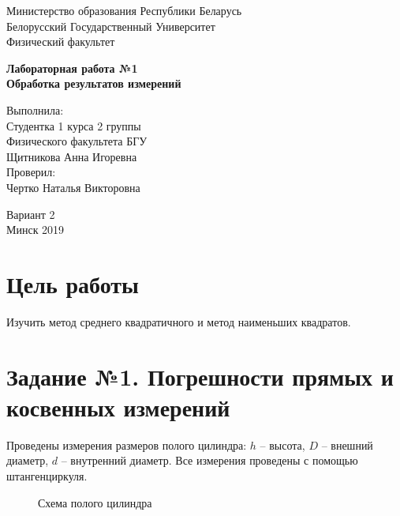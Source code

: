 \begin{titlepage}
	\begin{center}
		Министерство образования Республики Беларусь \\
		Белорусский Государственный Университет \\
		Физический факультет
	\end{center}
	
	\vspace{3cm}
	
	\begin{center}
		\textbf{Лабораторная работа №1} \\
		\textbf{Обработка результатов измерений}
	\end{center}
	
	\vspace{4cm}
	
	\begin{flushright}
		Выполнила: \\
		Студентка 1 курса 2 группы \\
		Физического факультета БГУ \\
		Щитникова Анна Игоревна \\[1cm]
		Проверил: \\
		Чертко Наталья Викторовна
	\end{flushright}
	
	\vspace{4cm}
	
	\begin{center}
		Вариант 2 \\
		Минск 2019
	\end{center}
\end{titlepage}

\section*{Цель работы}
Изучить метод среднего квадратичного и метод наименьших квадратов.

\section*{Задание №1. Погрешности прямых и косвенных измерений}
Проведены измерения размеров полого цилиндра: $h$ -- высота, $D$ -- внешний диаметр, $d$ -- внутренний диаметр. Все измерения проведены с помощью штангенциркуля.

\begin{figure}[h!]
	\centering
	\caption{Схема полого цилиндра}
	\label{fig:cylinder}
\end{figure}

